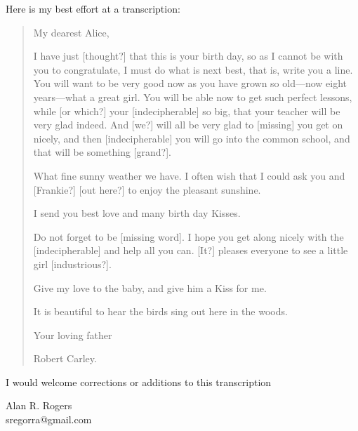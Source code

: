 \documentclass[12pt]{article}
\begin{document}
Here is my best effort at a transcription:
\begin{quotation}
  \noindent My dearest Alice,

  I have just [thought?] that this is your birth day, so as I cannot
  be with you to congratulate, I must do what is next best, that is,
  write you a line. You will want to be very good now as you have
  grown so old---now eight years---what a great girl. You will be able
  now to get such perfect lessons, while [or which?] your
  [indecipherable] so big, that your teacher will be very glad
  indeed. And [we?] will all be very glad to [missing] you get on
  nicely, and then [indecipherable] you will go into the common
  school, and that will be something [grand?].

  What fine sunny weather we have. I often wish that I could ask you
  and [Frankie?] [out here?] to enjoy the pleasant sunshine.

  I send you best love and many birth day Kisses.

  Do not forget to be [missing word]. I hope you get along nicely with
  the [indecipherable] and help all you can. [It?] pleases everyone to
  see a little girl [industrious?].

  Give my love to the baby, and give him a Kiss for me.

  It is beautiful to hear the birds sing out here in the woods.

  Your loving father

  \mbox{}\hfill Robert Carley.
\end{quotation}
I would welcome corrections or additions to this transcription


\bigskip

\mbox{}\hfill Alan R. Rogers\\
\mbox{}\hfill sregorra@gmail.com\\
\end{document}
